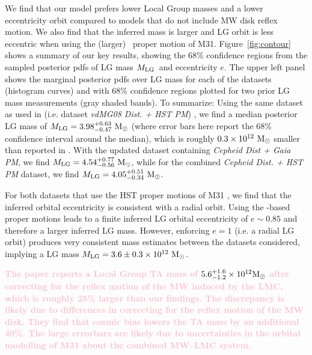 \documentclass[twocolumn]{aastex631}
\newcommand{\kc}[1]{\textcolor{pink}{\textbf{#1}} }
\newcommand{\mlg}{\ensuremath{M_{\rm LG}}}
\begin{document}
We find that our model prefers lower Local Group masses and a lower eccentricity
orbit compared to models that do not include MW disk reflex motion.
We also find that the inferred mass is larger and LG orbit is less eccentric
when using the (larger) \gaia\ proper motion of M31.
Figure~\ref{fig:contour} shows a summary of our key results, showing the 68\%
confidence regions from the sampled posterior pdfs of LG mass \mlg\ and
eccentricity $e$.
The upper left panel shows the marginal posterior pdfs over LG mass for each of
the datasets (histogram curves) and with 68\% confidence regions plotted for two
prior LG mass measurements (gray shaded bands).
To summarize: Using the same dataset as used in \citet{vdm2012}
(i.e. dataset \textit{vdMG08 Dist. + HST PM})
, we find a
median posterior LG mass of $\mlg = 3.98 ^{+0.63}_{-0.47}~\Msun$ (where error
bars here report the 68\% confidence interval around the median), which is
roughly $0.3\times 10^{12}~\mathrm{M}_\odot$ smaller than reported in \cite{vdm2012}. With
the updated dataset containing \textit{Cepheid Dist + Gaia PM}, we find
$\mlg = 4.54 ^{+0.77}_{-0.56}~\Msun$, while for the combined \textit{Cepheid
Dist. + HST PM} dataset, we find $\mlg = 4.05^{+0.51}_{-0.34}~\Msun$.


For both datasets that use the HST proper motions of M31 \citep{vdm2012}, we
find that the inferred orbital eccentricity is consistent with a radial orbit.
Using the \gaia-based proper motions \citep{Salomon2021} leads to a finite
inferred LG orbital eccentricity of $e\sim 0.85$ and therefore a larger inferred
LG mass.
However, enforcing $e=1$ (i.e. a radial LG orbit) produces very consistent mass
estimates between the datasets considered, implying a LG mass $\mlg = 3.6
\pm 0.3 \times 10^{12}~\Msun$.

\kc{The \cite{Benisty2022} paper reports a Local Group TA mass of
$5.6^{+1.6}_{-1.2}\times10^{12}\mathrm{M}_\odot$ after correcting for the reflex motion
of the MW induced by the LMC, which is roughly 25\% larger than our findings.
The discrepancy is likely due to differences in correcting for the reflex motion
of the MW disk.
They find that cosmic bias lowers the TA mass by an additional 40\%.
The large errorbars are likely due to uncertainties in the orbital modelling of
M31 about the combined MW--LMC system.}

\end{document}
